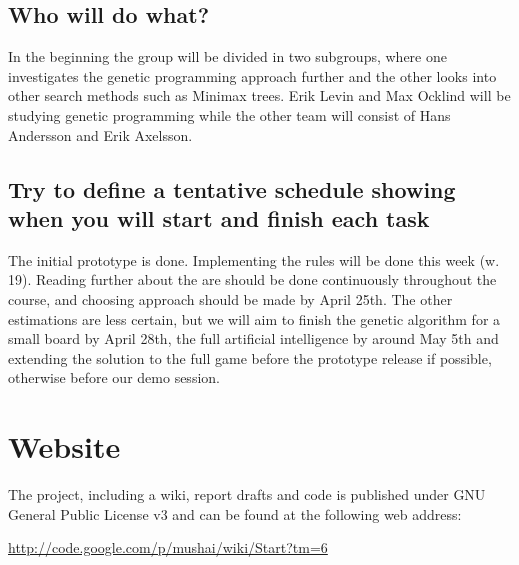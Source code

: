 \documentclass[times, 10pt,twocolumn]{article}
\begin{document}
\subsection{Who will do what?}

In the beginning the group will be divided in two subgroups, where one investigates the genetic programming approach further and the other looks into other search methods such as Minimax trees. Erik Levin and Max Ocklind will be studying genetic programming while the other team will consist of Hans Andersson and Erik Axelsson.

\subsection{Try to define a tentative schedule showing when you will start and finish each task}

The initial prototype is done. Implementing the rules will be done this week (w. 19). Reading further about the are should be done continuously throughout the course, and choosing approach should be made by April 25th. The other estimations are less certain, but we will aim to finish the genetic algorithm for a small board by April 28th, the full artificial intelligence by around May 5th and extending the solution to the full game before the prototype release if possible, otherwise before our demo session.

\section{Website}
The project, including a wiki, report drafts and code is published under GNU General Public License v3 and can be found at the following web address:

\url{http://code.google.com/p/mushai/wiki/Start?tm=6}



\end{document}
